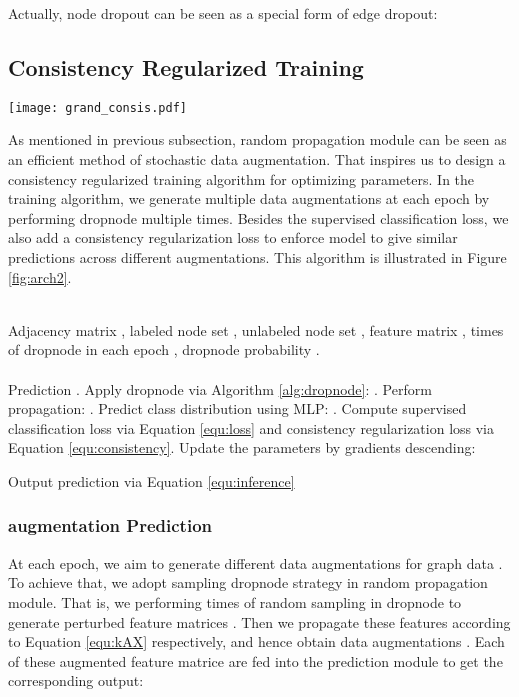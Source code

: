 {{Actually, node dropout can be seen as a special form of edge dropout:
}



\subsection{Consistency Regularized Training}
\label{sec:consis}
\begin{figure*}
	\centering
	\texttt{[image: grand\_consis.pdf]}
	\caption{Illustration of consistency regularized training for \model. }
	\label{fig:arch2}
\end{figure*}
As mentioned in previous subsection, random propagation module can be seen as an efficient method of stochastic data augmentation. That inspires us to design a consistency regularized training algorithm for optimizing parameters. 
  In the training algorithm, we generate multiple data augmentations at each epoch by performing dropnode multiple times. Besides the supervised classification loss, we also add a consistency regularization loss to enforce model to give similar predictions across different augmentations. This algorithm is illustrated in Figure \ref{fig:arch2}.


\begin{algorithm}[tb]
\caption{Consistency Regularized Training for \model}
\label{alg:2}
\begin{algorithmic}[1] \REQUIRE ~~\\
 Adjacency matrix ,
labeled node set ,
 unlabeled node set ,
feature matrix , 
times of dropnode in each epoch , dropnode probability .\\
\ENSURE ~~\\
Prediction .
\FOR{} 
\STATE Apply dropnode via Algorithm \ref{alg:dropnode}: . 
\STATE Perform propagation: .
\STATE Predict class distribution using MLP: .
\ENDFOR
\STATE Compute supervised classification loss  via Equation \ref{equ:loss} and consistency regularization loss via Equation \ref{equ:consistency}.
\STATE Update the parameters  by gradients descending:

\ENDWHILE
\STATE Output prediction  via Equation \ref{equ:inference}
\end{algorithmic}
\end{algorithm}

 
\subsubsection{augmentation Prediction}
At each epoch, we aim to generate  different data augmentations for graph data . To achieve that, we adopt sampling dropnode strategy in random propagation module. That is, we performing  times of random sampling in dropnode to generate  perturbed feature matrices . Then we propagate these features according to Equation \ref{equ:kAX} respectively, and hence obtain  data augmentations . Each of these augmented feature matrice are fed into the prediction module to get the corresponding output:


}
